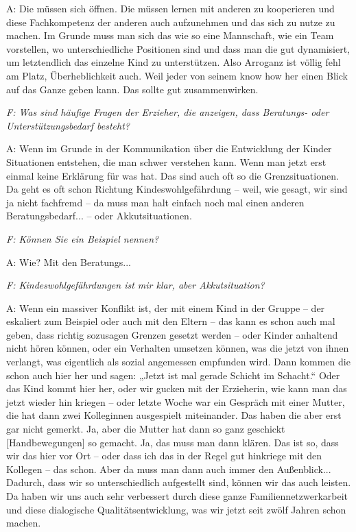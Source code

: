 \begin{linenumbers*}
A: Die müssen sich öffnen. Die müssen lernen mit anderen zu kooperieren und diese Fachkompetenz der anderen auch aufzunehmen und das sich zu nutze zu machen. Im Grunde muss man sich das wie so eine Mannschaft, wie ein Team vorstellen, wo unterschiedliche Positionen sind und dass man die gut dynamisiert, um letztendlich das einzelne Kind zu unterstützen. Also Arroganz ist völlig fehl am Platz, Überheblichkeit auch. Weil jeder von seinem know how her einen Blick auf das Ganze geben kann. Das sollte gut zusammenwirken. 

\emph{F: Was sind häufige Fragen der Erzieher, die anzeigen, dass Beratungs- oder Unterstützungsbedarf besteht?}

A: Wenn im Grunde in der Kommunikation über die Entwicklung der Kinder Situationen entstehen, die man schwer verstehen kann. Wenn man jetzt erst einmal keine Erklärung für was hat. Das sind auch oft so die Grenzsituationen. Da geht es oft schon Richtung Kindeswohlgefährdung -- weil, wie gesagt, wir sind ja nicht fachfremd -- da muss man halt einfach noch mal einen anderen Beratungsbedarf... -- oder Akkutsituationen. 

\emph{F: Können Sie ein Beispiel nennen?}

A: Wie? Mit den Beratungs...

\emph{F: Kindeswohlgefährdungen ist mir klar, aber Akkutsituation?}

A: Wenn ein massiver Konflikt ist, der mit einem Kind in der Gruppe -- der eskaliert zum Beispiel oder auch mit den Eltern -- das kann es schon auch mal geben, dass richtig sozusagen Grenzen gesetzt werden -- oder Kinder anhaltend nicht hören können, oder ein Verhalten umsetzen können, was die jetzt von ihnen verlangt, was eigentlich als sozial angemessen empfunden wird. Dann kommen die schon auch hier her und sagen: „Jetzt ist mal gerade Schicht im Schacht.“ Oder das Kind kommt hier her, oder wir gucken mit der Erzieherin, wie kann man das jetzt wieder hin kriegen -- oder letzte Woche war ein Gespräch mit einer Mutter, die hat dann zwei Kolleginnen ausgespielt miteinander. Das haben die aber erst gar nicht gemerkt. Ja, aber die Mutter hat dann so ganz geschickt [Handbewegungen] so gemacht. Ja, das muss man dann klären. Das ist so, dass wir das hier vor Ort -- oder dass ich das in der Regel gut hinkriege mit den Kollegen -- das schon. Aber da muss man dann auch immer den Außenblick... Dadurch, dass wir so unterschiedlich aufgestellt sind, können wir das auch leisten. Da haben wir uns auch sehr verbessert durch diese ganze Familiennetzwerkarbeit und diese dialogische Qualitätsentwicklung, was wir jetzt seit zwölf Jahren schon machen. 


\end{linenumbers*}
